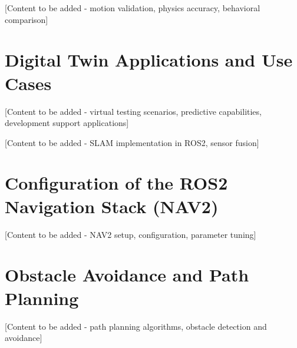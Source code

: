 [Content to be added - motion validation, physics accuracy, behavioral comparison]

\section{Digital Twin Applications and Use Cases}

[Content to be added - virtual testing scenarios, predictive capabilities, development support applications]

[Content to be added - SLAM implementation in ROS2, sensor fusion]

\section{Configuration of the ROS2 Navigation Stack (NAV2)}

[Content to be added - NAV2 setup, configuration, parameter tuning]

\section{Obstacle Avoidance and Path Planning}

[Content to be added - path planning algorithms, obstacle detection and avoidance]
